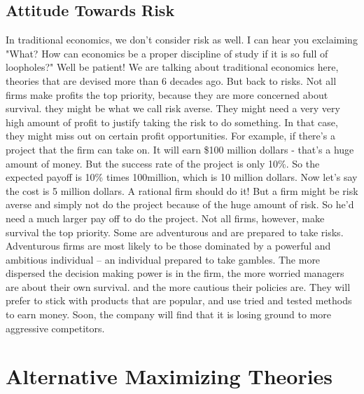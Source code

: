 \subsection{Attitude Towards Risk}
 In traditional economics, we don't consider risk as well. I can hear you exclaiming "What? How can economics be a proper discipline of study if it is so full of loopholes?" Well be patient! We are talking about traditional economics here, theories that are devised more than 6 decades ago. But back to risks. Not all firms make profits the top priority, because they are more concerned about survival. they might be what we call risk averse. They might need a very very high amount of profit to justify taking the risk to do something. In that case, they might miss out on certain profit opportunities. For example, if there's a project that the firm can take on. It will earn \$100 million dollars - that's a huge amount of money. But the success rate of the project is only 10\%. So the expected payoff is 10\% times 100million, which is 10 million dollars. Now let's say the cost is 5 million dollars. A rational firm should do it! But a firm might be risk averse and simply not do the project because of the huge amount of risk. So he'd need a much larger pay off to do the project. Not all firms, however, make survival the top priority. Some are adventurous and are prepared to take risks. Adventurous firms are most likely to be those dominated by a powerful and ambitious individual – an individual prepared to take gambles. The more dispersed the decision making power is in the firm, the more worried managers are about their own survival. and the more cautious their policies are. They will prefer to stick with products that are popular, and use tried and tested methods to earn money. Soon, the company will find that it is losing ground to more aggressive competitors.
\newpage
\section{Alternative Maximizing Theories}

